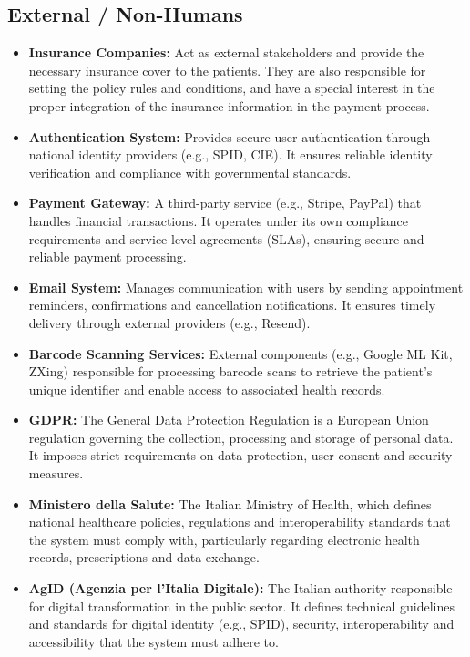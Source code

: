 \documentclass[12pt, a4paper]{article}
\begin{document}
\subsection{External / Non-Humans}
\begin{itemize}
    \item \textbf{Insurance Companies:} Act as external stakeholders and provide the necessary insurance cover to the patients. They are also responsible for setting the policy rules and conditions, and have a special interest in the proper integration of the insurance information in the payment process.
    
    \item \textbf{Authentication System:} Provides secure user authentication through national identity providers (e.g., SPID, CIE). It ensures reliable identity verification and compliance with governmental standards.

    \item \textbf{Payment Gateway:} A third-party service (e.g., Stripe, PayPal) that handles financial transactions. It operates under its own compliance requirements and service-level agreements (SLAs), ensuring secure and reliable payment processing.

    \item \textbf{Email System:} Manages communication with users by sending appointment reminders, confirmations and cancellation notifications. It ensures timely delivery through external providers (e.g., Resend).

    \item \textbf{Barcode Scanning Services:} External components (e.g., Google ML Kit, ZXing) responsible for processing barcode scans to retrieve the patient's unique identifier and enable access to associated health records.

    \item \textbf{GDPR:} The General Data Protection Regulation is a European Union regulation governing the collection, processing and storage of personal data. It imposes strict requirements on data protection, user consent and security measures.

    \item \textbf{Ministero della Salute:} The Italian Ministry of Health, which defines national healthcare policies, regulations and interoperability standards that the system must comply with, particularly regarding electronic health records, prescriptions and data exchange.

    \item \textbf{AgID (Agenzia per l'Italia Digitale):} The Italian authority responsible for digital transformation in the public sector. It defines technical guidelines and standards for digital identity (e.g., SPID), security, interoperability and accessibility that the system must adhere to.
\end{itemize}
\end{document}
